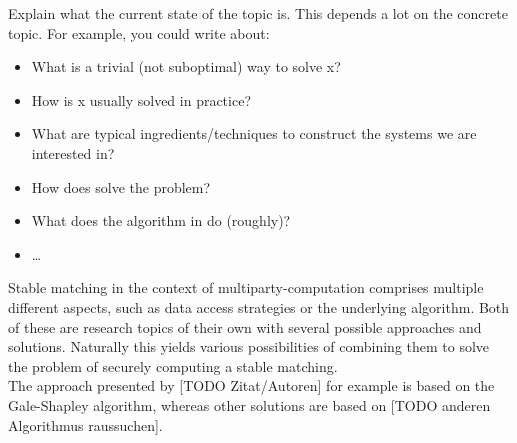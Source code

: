 Explain what the current state of the topic is. This depends a lot on the concrete topic.
For example, you could write about: 
\begin{itemize}
  \item What is a trivial (not suboptimal) way to solve x?
  \item How is x usually solved in practice? 
  \item What are typical ingredients/techniques to construct the systems we are interested in?
  \item How does \cite{testref} solve the problem?
  \item What does the algorithm in \cite{testref} do (roughly)? 
  \item \dots
\end{itemize}
Stable matching in the context of multiparty-computation comprises multiple different aspects, such as data access strategies or the underlying algorithm. Both of these are research topics of their own with several possible approaches and solutions. Naturally this yields various possibilities of combining them to solve the problem of securely computing a stable matching. \\
The approach presented by [TODO Zitat/Autoren] for example is based on the Gale-Shapley algorithm, whereas other solutions are based on [TODO anderen Algorithmus raussuchen].
